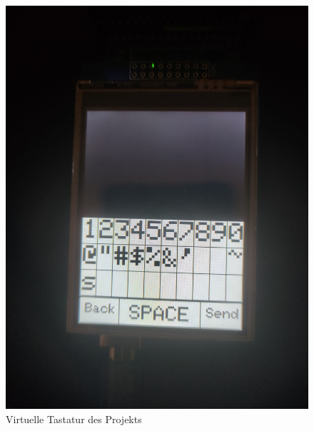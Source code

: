 \documentclass[a4paper, 11pt]{scrartcl}
\begin{document}
\begin{small}
\begin{figure}[H]
    \begin{center}
        \includegraphics[scale=0.13]{Bilder/special_keys.jpeg}
        \caption{Virtuelle Tastatur des Projekts}\label{pic:keys_special}
    \end{center}
\end{figure}


\end{small}
\end{document}
